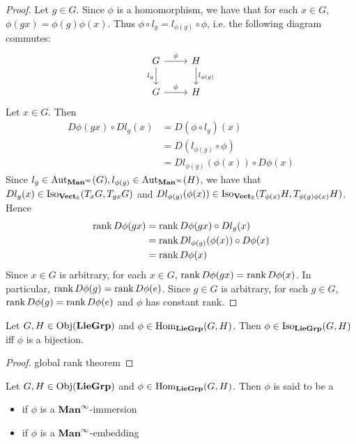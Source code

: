 \documentclass{book}
\begin{document}
\begin{proof}
	Let $g \in G$. Since $\phi$ is a homomorphism, we have that for each $x \in G$, $\phi(g x) = \phi(g) \phi(x)$. Thus $\phi \circ l_g = l_{\phi(g)} \circ \phi$, i.e. the following diagram commutes: 
	\[ 
	\begin{tikzcd}
		G \arrow[r, "\phi"] \arrow[d, "l_g"'] & H \arrow[d, "l_{\phi(g)}"]  \\
		G \arrow[r, "\phi"]                   & H
	\end{tikzcd}
	\]
	Let $x \in G$. Then
	\begin{align*}
		D\phi(gx) \circ D l_g (x) 
		& = D(\phi \circ l_g) (x) \\
		& = D(l_{\phi(g)} \circ \phi) \\
		& = D l_{\phi(g)} (\phi(x)) \circ D \phi (x) 
	\end{align*}
	Since $l_g \in \operatorname{Aut}_{\operatorname*{\text{\textbf{Man}}^{\infty}}}(G), l_{\phi(g)} \in \operatorname{Aut}_{\operatorname*{\text{\textbf{Man}}^{\infty}}}(H)$, we have that $D l_g (x) \in \operatorname{Iso}_{\operatorname*{\text{\textbf{Vect}}_{\mathbb{R}}}}(T_x G, T_{g x} G)$ and $D l_{\phi(g)}(\phi(x)) \in \operatorname{Iso}_{\operatorname*{\text{\textbf{Vect}}_{\mathbb{R}}}}(T_{\phi(x)}H, T_{\phi(g) \phi(x)}H)$. Hence 
	\begin{align*}
		\operatorname{\text{rank}} D\phi(gx)
		& = \operatorname{\text{rank}} D\phi(gx) \circ D l_g (x) \\
		& = \operatorname{\text{rank}} D l_{\phi(g)} (\phi(x)) \circ D \phi (x) \\
		& = \operatorname{\text{rank}}  D \phi (x)
	\end{align*} 
	Since $x \in G$ is arbitrary, for each $x \in G$, $\operatorname{\text{rank}} D\phi(gx) = \operatorname{\text{rank}}  D \phi (x)$. In particular, $\operatorname{\text{rank}} D\phi(g) = \operatorname{\text{rank}}  D \phi (e)$. Since $g \in G$ is arbitrary, for each $g \in G$, $\operatorname{\text{rank}} D\phi(g) = \operatorname{\text{rank}}  D \phi (e)$ and $\phi$ has constant rank. 
\end{proof}


\begin{ex}
	Let $G, H \in \operatorname{Obj}(\operatorname*{\text{\textbf{LieGrp}}})$ and $\phi \in \operatorname{Hom}_{\operatorname*{\text{\textbf{LieGrp}}}}(G, H)$. Then $\phi \in \operatorname{Iso}_{\operatorname*{\text{\textbf{LieGrp}}}}(G, H)$ iff $\phi$ is a bijection.
\end{ex}

\begin{proof}
	global rank theorem 
\end{proof}


\begin{defn}
	Let $G, H \in \operatorname{Obj}(\operatorname*{\text{\textbf{LieGrp}}})$ and $\phi \in \operatorname{Hom}_{\operatorname*{\text{\textbf{LieGrp}}}}(G, H)$. Then $\phi$ is said to be a 
	\begin{itemize}
		\item {} if $\phi$ is a $\operatorname*{\text{\textbf{Man}}^{\infty}}$-immersion  
		\item {} if $\phi$ is a $\operatorname*{\text{\textbf{Man}}^{\infty}}$-embedding  
	\end{itemize}
\end{defn}
\end{document}
